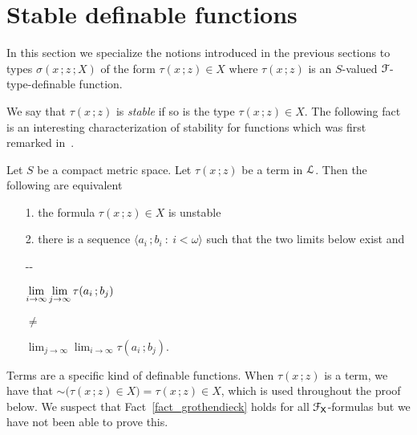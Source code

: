 \section{Stable definable functions}
\def\medrel#1{\parbox{5ex}{\hfil $#1$}}
\def\ceq#1#2#3{\parbox[t]{28ex}{$\displaystyle #1$}\medrel{#2}{$\displaystyle #3$}}

In this section we specialize the notions introduced in the previous sections to types $\sigma(x\,;z\,;X)$ of the form $\tau(x\,;z)\in X$ where $\tau(x\,;z)$ is an $S$-valued ${\EuScript F}$-type-definable function.

We say that $\tau(x\,;z)$ is \emph{stable\/} if so is the type $\tau(x\,;z)\in X$.
The following fact is an interesting characterization of stability for functions which was first remarked in~\cite{B}.

\begin{fact}\label{fact_grothendieck}
  Let $S$ be a compact metric space.
  Let $\tau(x\,;z)$ be a term in ${\EuScript L}$.
  Then the following are equivalent
  \begin{itemize}
    \item [1.] the formula $\tau(x\,;z)\in X$ is unstable
    \item [2.] there is a sequence $\langle a_i\,;b_i\ :\ i<\omega\rangle$ such that the two limits below exist and\smallskip
    
    \noindent\kern-\kern-
    \ceq{\hfill \lim_{i\to\infty}\lim_{j\to\infty}\tau(a_i\,;b_j)}{\neq}{\lim_{j\to\infty}\lim_{i\to\infty}\tau(a_i\,;b_j).}

    



  \end{itemize}
\end{fact}  
  Terms are a specific kind of definable functions.
  When $\tau(x\,;z)$ is a term, we have that ${\sim}\big(\tau(x\,;z)\in X\big)=\tau(x\,;z)\in X$, which is used throughout the proof below.
  We suspect that Fact~\ref{fact_grothendieck} holds for all ${\EuScript F}_{\sf X}$-formulas but we have not been able to prove this.


